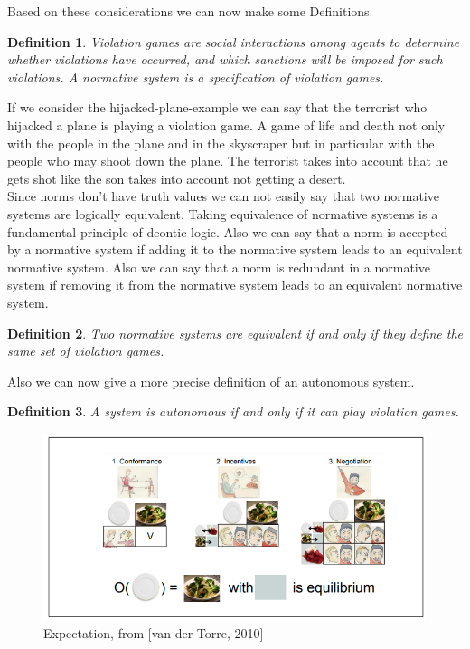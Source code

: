 \documentclass[conference]{IEEE}
\newtheorem{definition}{Definition}
\begin{document}
Based on these considerations we can now make some Definitions.\\
\newpage
\begin{definition}
Violation games are social interactions
among agents to determine whether violations have occurred, and which sanctions
will be imposed for such violations. A normative system is a specification of violation
games.\cite{b2}\\
\end{definition}

If we consider the hijacked-plane-example we can say that the terrorist who hijacked a plane is playing a violation game. A game of life and death not only with the people in the plane and in the skyscraper but in particular with the people who may shoot down the plane. The terrorist takes into account that he gets shot like the son takes into account not getting a desert.\\
Since norms don't have truth values we can not easily say that two normative systems are logically equivalent. Taking equivalence of normative systems is a fundamental principle of deontic logic. Also we can say that a norm is accepted by a normative system  if adding it to the normative system leads to an equivalent normative system. Also we can say that a norm is redundant in a normative system if removing it from the normative system leads to an equivalent normative system.\\

\begin{definition}
Two normative systems are equivalent if and only if they define the same set of violation games.\cite{b2}\\
\end{definition}

Also we can now give a more precise definition of an autonomous system.

\begin{definition}
A system is autonomous if and only if it can play violation games.\cite{b2}\\
\end{definition}

\begin{center}
\begin{figure}
    \centering
    \includegraphics[scale=0.8]{3.png}
    \caption{Expectation, from [van der Torre, 2010]}
    \label{fig:my_label}
\end{figure}
\end{center}
\end{document}
